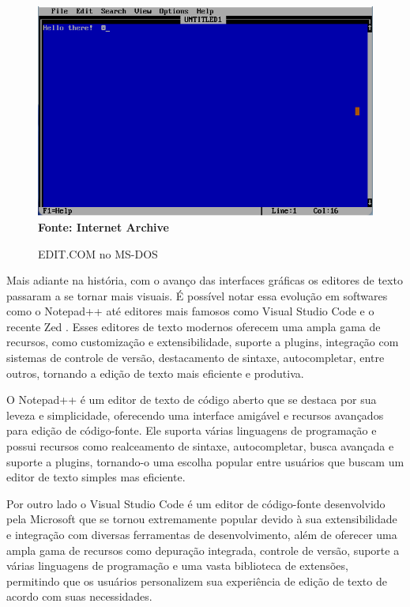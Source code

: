 \FloatBarrier
\begin{figure}[!htbp]
    \centering
    \caption{EDIT.COM no MS-DOS}
    \includegraphics[scale=0.8]{imagens/EDIT_MSDOS}
    \\\textbf{Fonte: Internet Archive} \label{fig:EDIT_MSDOS}
\end{figure}
\FloatBarrier

Mais adiante na história, com o avanço das interfaces gráficas os editores de
texto passaram a se tornar mais visuais. É possível notar essa evolução em softwares
como o Notepad++ \cite{NotepadPlusPlus2025} até editores mais famosos como Visual
Studio Code \cite{VSCode2025} e o recente Zed \cite{ZedEditor2025}. Esses
editores de texto modernos oferecem uma ampla gama de recursos, como customização
e extensibilidade, suporte a plugins, integração com sistemas de controle de versão,
destacamento de sintaxe, autocompletar, entre outros, tornando a edição de texto
mais eficiente e produtiva.

O Notepad++ é um editor de texto de código aberto que se destaca por sua leveza e
simplicidade, oferecendo uma interface amigável e recursos avançados para edição
de código-fonte. Ele suporta várias linguagens de programação e possui recursos como
realceamento de sintaxe, autocompletar, busca avançada e suporte a plugins,
tornando-o uma escolha popular entre usuários que buscam um editor de texto
simples mas eficiente.

Por outro lado o Visual Studio Code é um editor de código-fonte desenvolvido
pela Microsoft que se tornou extremamente popular devido à sua extensibilidade e
integração com diversas ferramentas de desenvolvimento, além de oferecer uma ampla
gama de recursos como depuração integrada, controle de versão, suporte a várias linguagens
de programação e uma vasta biblioteca de extensões, permitindo que os usuários
personalizem sua experiência de edição de texto de acordo com suas necessidades.

